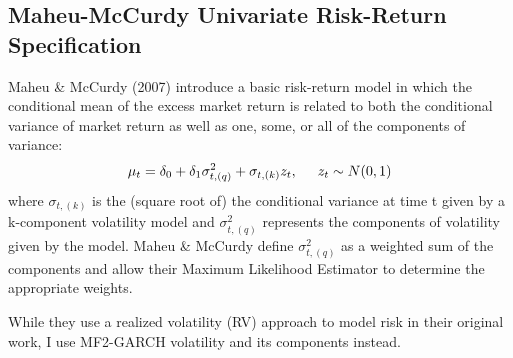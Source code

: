 \documentclass[12pt]{article}
\begin{document}
\subsection{Maheu-McCurdy Univariate Risk-Return Specification}
Maheu \& McCurdy (2007) introduce a basic risk-return model in which the conditional mean of the excess market return is related to both the conditional variance of market return as well as one, some, or all of the components of variance:
\begin{equation}
\mu_t=\delta_0+\delta_1\sigma_{t,(q)}^2+\sigma_{t,(k)}z_t, \hspace{5mm}z_t\sim N(0,1)
\end{equation}
where $\sigma_{t,(k)}$ is the (square root of) the conditional variance at time t given by a k-component volatility model and $\sigma_{t,(q)}^2$ represents the components of volatility given by the model. Maheu \& McCurdy define $\sigma_{t,(q)}^2$ as a weighted sum of the components and allow their Maximum Likelihood Estimator to determine the appropriate weights.\par
While they use a realized volatility (RV) approach to model risk in their original work, I use MF2-GARCH volatility and its components instead.
\end{document}
